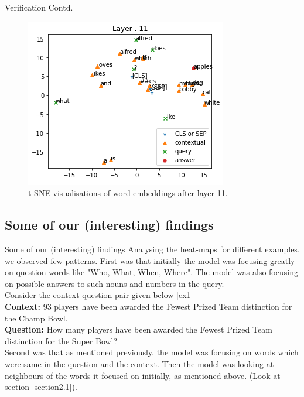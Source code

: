 \documentclass[10pt]{beamer}
\begin{document}
\begin{frame}{Verification Contd.}
\begin{figure}
    \includegraphics[scale=0.5]{layer_11.png}
    \caption{t-SNE visualisations of word embeddings after layer 11.}
\end{figure}
\end{frame}

 

\subsection{Some of our (interesting) findings}
\begin{frame}{Some of our (interesting) findings}
Analysing the heat-maps for different examples, we observed few patterns. First was that initially the model was focusing greatly on question words like "Who, What, When, Where". The model was also focusing on possible answers to such nouns and numbers in the query.
\\
Consider the context-question pair given below \ref{ex1}\\
\textbf{Context: }93 players have been awarded the Fewest Prized Team distinction for the Champ Bowl.\\
\textbf{Question: }How many players have been awarded the Fewest Prized Team distinction for the Super Bowl?\\
Second was that as mentioned previously, the model was focusing on words which were same in the question and the context. Then the model was looking at neighbours of the words it focused on initially, as mentioned above. (Look at section \ref{section2.1}).
\end{frame}
\end{document}
